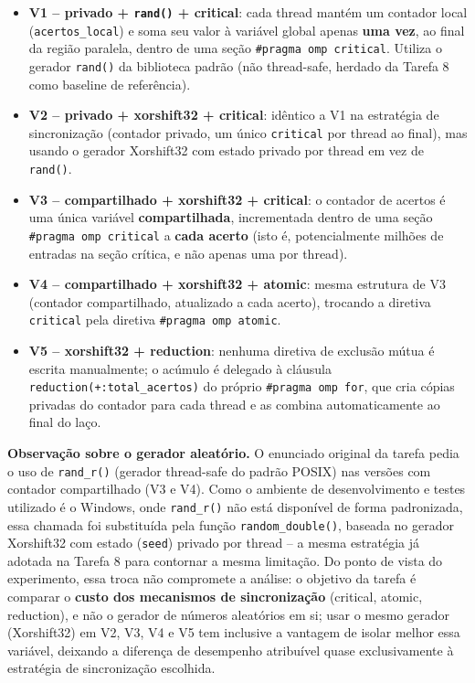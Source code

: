 \documentclass[a4paper,12pt]{article}
\begin{document}
\begin{itemize}
    \item \textbf{V1 -- privado + \texttt{rand()} + critical}: cada
    thread mantém um contador local (\texttt{acertos\_local}) e soma
    seu valor à variável global apenas \textbf{uma vez}, ao final da
    região paralela, dentro de uma seção \texttt{\#pragma omp critical}.
    Utiliza o gerador \texttt{rand()} da biblioteca padrão (não
    thread-safe, herdado da Tarefa 8 como baseline de referência).

    \item \textbf{V2 -- privado + xorshift32 + critical}: idêntico a
    V1 na estratégia de sincronização (contador privado, um único
    \texttt{critical} por thread ao final), mas usando o gerador
    Xorshift32 com estado privado por thread em vez de \texttt{rand()}.

    \item \textbf{V3 -- compartilhado + xorshift32 + critical}: o
    contador de acertos é uma única variável \textbf{compartilhada},
    incrementada dentro de uma seção \texttt{\#pragma omp critical} a
    \textbf{cada acerto} (isto é, potencialmente milhões de entradas na
    seção crítica, e não apenas uma por thread).

    \item \textbf{V4 -- compartilhado + xorshift32 + atomic}: mesma
    estrutura de V3 (contador compartilhado, atualizado a cada acerto),
    trocando a diretiva \texttt{critical} pela diretiva
    \texttt{\#pragma omp atomic}.

    \item \textbf{V5 -- xorshift32 + reduction}: nenhuma diretiva de
    exclusão mútua é escrita manualmente; o acúmulo é delegado à
    cláusula \texttt{reduction(+:total\_acertos)} do próprio
    \texttt{\#pragma omp for}, que cria cópias privadas do contador
    para cada thread e as combina automaticamente ao final do laço.
\end{itemize}

\textbf{Observação sobre o gerador aleatório.} O enunciado original
da tarefa pedia o uso de \texttt{rand\_r()} (gerador thread-safe do
padrão POSIX) nas versões com contador compartilhado (V3 e V4).
Como o ambiente de desenvolvimento e testes utilizado é o Windows,
onde \texttt{rand\_r()} não está disponível de forma padronizada, essa
chamada foi substituída pela função \texttt{random\_double()}, baseada
no gerador Xorshift32 com estado (\texttt{seed}) privado por thread --
a mesma estratégia já adotada na Tarefa 8 para contornar a mesma
limitação. Do ponto de vista do experimento, essa troca não compromete
a análise: o objetivo da tarefa é comparar o \textbf{custo dos
mecanismos de sincronização} (critical, atomic, reduction), e não o
gerador de números aleatórios em si; usar o mesmo gerador
(Xorshift32) em V2, V3, V4 e V5 tem inclusive a vantagem de isolar
melhor essa variável, deixando a diferença de desempenho atribuível
quase exclusivamente à estratégia de sincronização escolhida.
\end{document}
